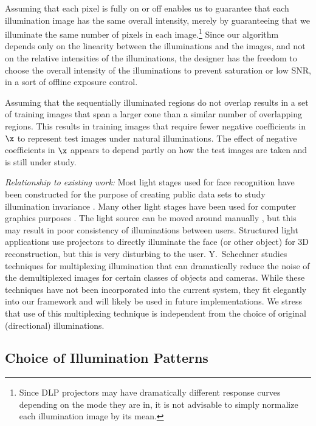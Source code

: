 Assuming that each pixel is fully on or off enables us to guarantee
that each illumination image has the same overall intensity, merely
by guaranteeing that we illuminate the same number of pixels in each image.\footnote{Since DLP projectors may have dramatically different response
curves depending on the mode they are in, it is not advisable to simply normalize each illumination image by its mean.}
Since our algorithm depends only on  the
linearity between the illuminations and the images, and not on the
relative intensities of the illuminations, the designer has the freedom to choose the overall intensity of the illuminations
to prevent saturation or low SNR, in a sort of offline exposure control.

Assuming that the sequentially illuminated regions do not overlap results in a
set of training images that span a larger cone than a similar number of
overlapping regions.  This results in training images that require fewer
negative coefficients in $\x$ to represent test images under natural
illuminations.  The effect of negative coefficients in $\x$ appears to depend
partly on how the test images are taken and is still under study.

{\em Relationship to existing work:} Most light stages used for face recognition have
been constructed for the purpose of creating public data sets to study
illumination invariance \cite{Georghiades2001-PAMI, Gross2008-FGR}.  Many other
light stages have been used for computer graphics purposes
\cite{debevec2000acquiring, jones2005performance}.
The light source can be
moved around manually \cite{masselus2002free}, but this may result in poor
consistency of illuminations between users.  Structured light applications use projectors to
directly illuminate the face (or other object) \cite{zhang2002rapid} for 3D
reconstruction, but this is very disturbing to the user.
Y.\ Schechner \cite{schechner2007multiplexing}
studies techniques for multiplexing illumination that can dramatically reduce the noise
of the demultiplexed images for certain classes of objects and cameras.
While these techniques have not been incorporated into the current
system, they fit elegantly into our framework and will likely be used
in future implementations.  We stress that use of this multiplexing technique
is independent from the choice of original (directional) illuminations.

\subsection{Choice of Illumination Patterns}

